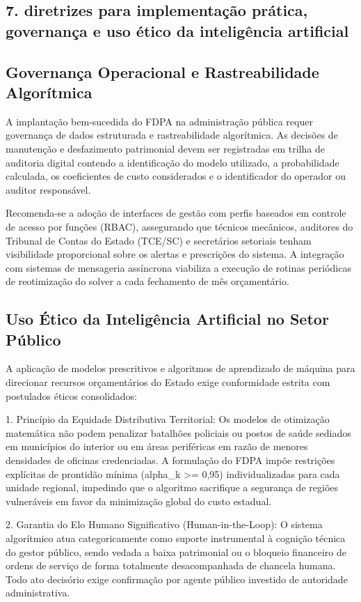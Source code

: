 \documentclass[12pt,a4paper]{article}
\begin{document}
\subsection{7. diretrizes para implementação prática, governança e uso ético da inteligência artificial}


\subsection{Governança Operacional e Rastreabilidade Algorítmica}

A implantação bem-sucedida do FDPA na administração pública requer governança de dados estruturada e rastreabilidade algorítmica. As decisões de manutenção e desfazimento patrimonial devem ser registradas em trilha de auditoria digital contendo a identificação do modelo utilizado, a probabilidade calculada, os coeficientes de custo considerados e o identificador do operador ou auditor responsável.

Recomenda-se a adoção de interfaces de gestão com perfis baseados em controle de acesso por funções (RBAC), assegurando que técnicos mecânicos, auditores do Tribunal de Contas do Estado (TCE/SC) e secretários setoriais tenham visibilidade proporcional sobre os alertas e prescrições do sistema. A integração com sistemas de mensageria assíncrona viabiliza a execução de rotinas periódicas de reotimização do solver a cada fechamento de mês orçamentário.


\subsection{Uso Ético da Inteligência Artificial no Setor Público}

A aplicação de modelos prescritivos e algoritmos de aprendizado de máquina para direcionar recursos orçamentários do Estado exige conformidade estrita com postulados éticos consolidados:

1. Princípio da Equidade Distributiva Territorial: Os modelos de otimização matemática não podem penalizar batalhões policiais ou postos de saúde sediados em municípios do interior ou em áreas periféricas em razão de menores densidades de oficinas credenciadas. A formulação do FDPA impõe restrições explícitas de prontidão mínima (alpha\_k >= 0,95) individualizadas para cada unidade regional, impedindo que o algoritmo sacrifique a segurança de regiões vulneráveis em favor da minimização global do custo estadual.

2. Garantia do Elo Humano Significativo (Human-in-the-Loop): O sistema algorítmico atua categoricamente como suporte instrumental à cognição técnica do gestor público, sendo vedada a baixa patrimonial ou o bloqueio financeiro de ordens de serviço de forma totalmente desacompanhada de chancela humana. Todo ato decisório exige confirmação por agente público investido de autoridade administrativa.
\end{document}
